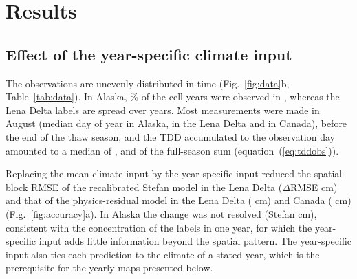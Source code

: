 \section{Results}\label{sec:results}

\subsection{Effect of the year-specific climate input}
The observations are unevenly distributed in time (Fig.~\ref{fig:data}b, Table~\ref{tab:data}). In Alaska, \ntopyrshareAk\% of the cell-years were observed in \ntopyrAk, whereas the Lena Delta labels are spread over \nnyrLe{} years. Most measurements were made in August (median day of year \ndoymedAk{} in Alaska, \ndoymedLe{} in the Lena Delta and \ndoymedCa{} in Canada), before the end of the thaw season, and the TDD accumulated to the observation day amounted to a median of \ntddfracAk, \ntddfracLe{} and \ntddfracCa{} of the full-season sum (equation~(\ref{eq:tddobs})).

Replacing the mean climate input by the year-specific input reduced the spatial-block RMSE of the recalibrated Stefan model in the Lena Delta ($\Delta$RMSE \ndforcLePo{} cm) and that of the physics-residual model in the Lena Delta (\ndforcLeRo{} cm) and Canada (\ndforcCaRo{} cm) (Fig.~\ref{fig:accuracy}a). In Alaska the change was not resolved (Stefan \ndforcAkPo{} cm), consistent with the concentration of the labels in one year, for which the year-specific input adds little information beyond the spatial pattern. The year-specific input also ties each prediction to the climate of a stated year, which is the prerequisite for the yearly maps presented below.


